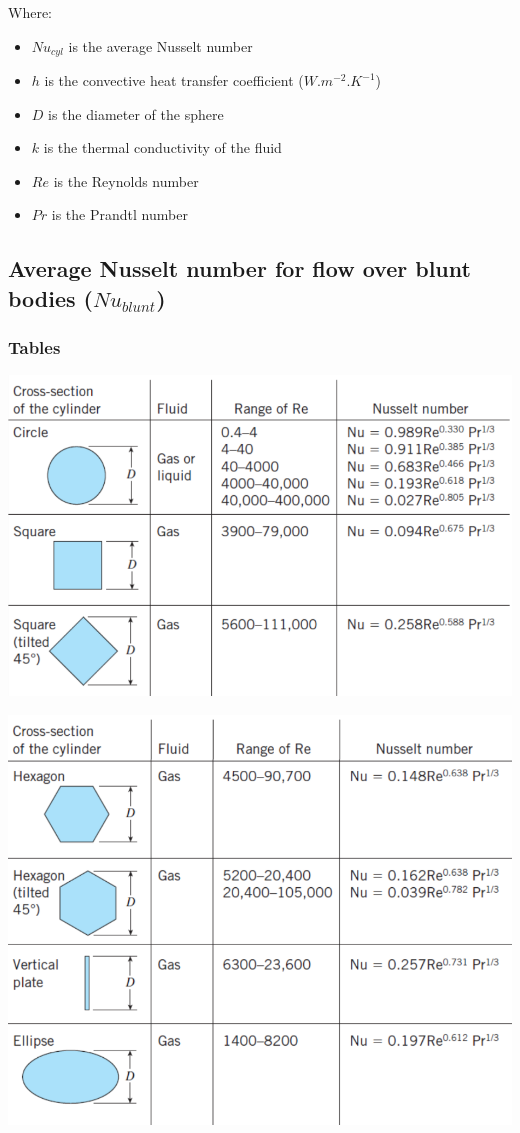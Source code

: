 \documentclass[11pt]{article}
\begin{document}
Where:
\begin{itemize}
\item \(Nu_{cyl}\) is the average Nusselt number
\item \(h\) is the convective heat transfer coefficient (\(\unit{W.m^{-2}.K^{-1}}\))
\item \(D\) is the diameter of the sphere
\item \(k\) is the thermal conductivity of the fluid
\item \(Re\) is the Reynolds number
\item \(Pr\) is the Prandtl number
\end{itemize}

\subsection{Average Nusselt number for flow over blunt bodies (\(Nu_{blunt}\))}
\label{sec:org527290b}

\subsubsection{Tables}
\label{sec:org02b3e94}
\begin{center}
\includegraphics[width=.9\linewidth]{./images/average-nusselt-number-blunt-bodies-page-1.png}
\end{center}
\begin{center}
\includegraphics[width=.9\linewidth]{./images/average-nusselt-number-blunt-bodies-page-2.png}
\end{center}
\end{document}
